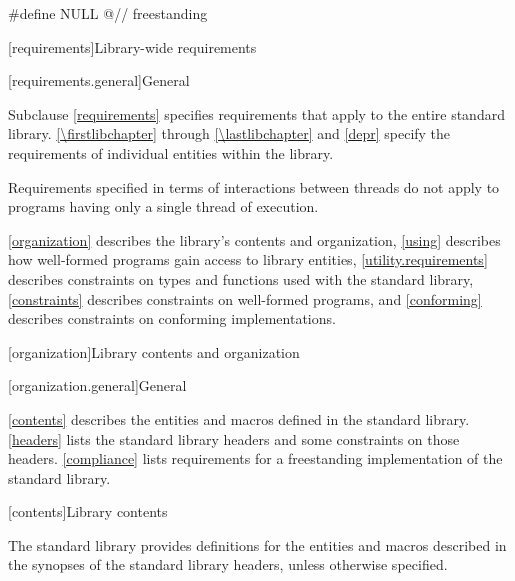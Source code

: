 \pnum
\begin{example}
\begin{codeblock}
#define NULL @\seebelow@      // freestanding
\end{codeblock}
\end{example}

\begin{example}
\begin{codeblock}
// all freestanding
namespace std {
\end{codeblock}
\end{example}

[requirements]{Library-wide requirements}

[requirements.general]{General}

\pnum
Subclause \ref{requirements} specifies requirements that apply to the entire \Cpp{} standard library.
\ref{\firstlibchapter} through \ref{\lastlibchapter} and \ref{depr}
specify the requirements of individual entities within the library.

\pnum
Requirements specified in terms of interactions between threads do not apply to
programs having only a single thread of execution.

\pnum
\ref{organization} describes the library's contents and
organization, \ref{using} describes how well-formed \Cpp{} programs gain access to library
entities,
\ref{utility.requirements} describes constraints on types and functions used with
the \Cpp{} standard library,
\ref{constraints} describes constraints on well-formed \Cpp{} programs, and
\ref{conforming} describes constraints on conforming implementations.

[organization]{Library contents and organization}

[organization.general]{General}

\pnum
\ref{contents} describes the entities and macros defined in the \Cpp{} standard library.
\ref{headers} lists the standard library headers and some constraints on those headers.
\ref{compliance} lists requirements for a freestanding implementation of the \Cpp{}
standard library.

[contents]{Library contents}

\pnum
The \Cpp{} standard library provides definitions
for the entities and macros described in the synopses
of the \Cpp{} standard library headers,
unless otherwise specified.

